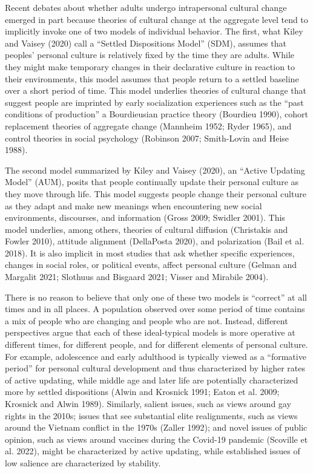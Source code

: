 \documentclass[
  12pt,
]{article}
\begin{document}
Recent debates about whether adults undergo intrapersonal cultural
change emerged in part because theories of cultural change at the
aggregate level tend to implicitly invoke one of two models of
individual behavior. The first, what Kiley and Vaisey (2020) call a
``Settled Dispositions Model'' (SDM), assumes that peoples' personal
culture is relatively fixed by the time they are adults. While they
might make temporary changes in their declarative culture in reaction to
their environments, this model assumes that people return to a settled
baseline over a short period of time. This model underlies theories of
cultural change that suggest people are imprinted by early socialization
experiences such as the ``past conditions of production'' a Bourdieusian
practice theory (Bourdieu 1990), cohort replacement theories of
aggregate change (Mannheim 1952; Ryder 1965), and control theories in
social psychology (Robinson 2007; Smith-Lovin and Heise 1988).

The second model summarized by Kiley and Vaisey (2020), an ``Active
Updating Model'' (AUM), posits that people continually update their
personal culture as they move through life. This model suggests people
change their personal culture as they adapt and make new meanings when
encountering new social environments, discourses, and information (Gross
2009; Swidler 2001). This model underlies, among others, theories of
cultural diffusion (Christakis and Fowler 2010), attitude alignment
(DellaPosta 2020), and polarization (Bail et al. 2018). It is also
implicit in most studies that ask whether specific experiences, changes
in social roles, or political events, affect personal culture (Gelman
and Margalit 2021; Slothuus and Bisgaard 2021; Visser and Mirabile
2004).

There is no reason to believe that only one of these two models is
``correct'' at all times and in all places. A population observed over
some period of time contains a mix of people who are changing and people
who are not. Instead, different perspectives argue that each of these
ideal-typical models is more operative at different times, for different
people, and for different elements of personal culture. For example,
adolescence and early adulthood is typically viewed as a ``formative
period'' for personal cultural development and thus characterized by
higher rates of active updating, while middle age and later life are
potentially characterized more by settled dispositions (Alwin and
Krosnick 1991; Eaton et al. 2009; Krosnick and Alwin 1989). Similarly,
salient issues, such as views around gay rights in the 2010s; issues
that see substantial elite realignments, such as views around the
Vietnam conflict in the 1970s (Zaller 1992); and novel issues of public
opinion, such as views around vaccines during the Covid-19 pandemic
(Scoville et al. 2022), might be characterized by active updating, while
established issues of low salience are characterized by stability.
\end{document}
